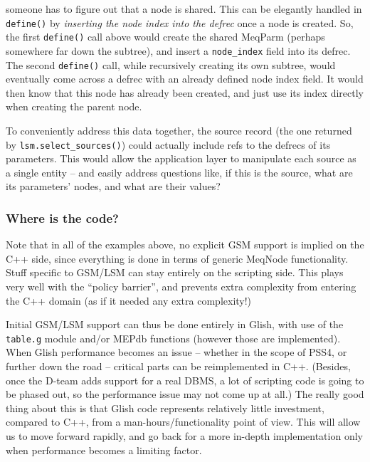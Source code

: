 \documentclass[]{lofar}
\begin{document}
  \noindent someone has to figure out that a node is shared. This can be
  elegantly handled in {\tt define()} by {\em inserting the node index into the
  defrec} once a node is created. So, the first {\tt define()} call above would
  create the shared MeqParm (perhaps somewhere far down the subtree), and insert
  a {\tt node\_index} field into its defrec. The second {\tt define()} call,
  while recursively creating its own subtree, would eventually come across a
  defrec with an already defined node index field. It would then know that this
  node has already been created, and just use its index directly when creating
  the parent node.
  
  To conveniently address this data together, the source record (the one returned
  by {\tt lsm.select\_sources()}) could actually include refs to the defrecs of
  its parameters. This would allow the application layer to manipulate each
  source as a single entity -- and easily address questions like, if this is the
  source, what are its parameters' nodes, and what are their values?
  
\subsubsection{Where is the code?}
  
  Note that in all of the examples above, no explicit GSM support is implied on
  the C++ side, since everything is done in terms of generic MeqNode
  functionality. Stuff specific to GSM/LSM can stay entirely on the scripting
  side. This plays very well with the ``policy barrier'', and prevents extra
  complexity from entering the C++ domain (as if it needed any extra complexity!)
  
  Initial GSM/LSM support can thus be done entirely in Glish, with use of the
  {\tt table.g} module and/or MEPdb functions (however those are
  implemented). When Glish performance becomes an issue -- whether in the scope
  of PSS4, or  further down the road -- critical parts can be reimplemented in
  C++. (Besides, once the D-team adds support for a real DBMS, a lot of scripting
  code is going to be phased out, so the performance issue may not come up at
  all.) The really good thing about this is that Glish code represents relatively
  little investment, compared to C++, from a man-hours/functionality point of
  view. This will allow us to move forward rapidly, and go back for a more
  in-depth implementation only when performance becomes a limiting factor.
  
\end{document}
